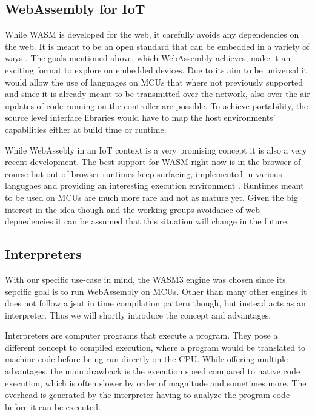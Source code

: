 \subsection{WebAssembly for IoT}

While WASM is developed for the web, it carefully avoids any dependencies on the web. It is meant to be an open standard that can be embedded in a variety of ways \autocite{noauthor_non-web_nodate}. The goals mentioned above, which WebAssembly achieves, make it an exciting format to explore on embedded devices. Due to its aim to be universal it would allow the use of languages on MCUs that where not previously supported and since it is already meant to be transmitted over the network, also over the air updates of code running on the controller are possible. To achieve portability, the source level interface libraries would have to map the host environments' capabilities either at build time or runtime.

While WebAssebly in an IoT context is a very promising concept it is also a very recent development. The best support for WASM right now is in the browser of course but out of browser runtimes keep surfacing, implemented in various langugaes and providing an interesting execution environment \autocite{akinyemi_appcypherawesome-wasm-runtimes_2020}. Runtimes meant to be used on MCUs are much more rare and not as mature yet. Given the big interest in the idea though and the working groups avoidance of web depnedencies it can be assumed that this situation will change in the future.

\subsection{Interpreters}

With our specific use-case in mind, the WASM3 \autocite{noauthor_wasm3wasm3_2020} engine was chosen since its sepcific goal is to run WebAssembly on MCUs. Other than many other engines it does not follow a jsut in time compilation pattern though, but instead acts as an interpreter. Thus we will shortly introduce the concept and advantages.

Interpreters are computer programs that execute a program. They pose a different concept to compiled execution, where a program would be translated to machine code before being run directly on the CPU. While offering multiple advantages, the main drawback is the execution speed compared to native code execution, which is often slower by order of magnitude and sometimes more. The overhead is generated by the interpreter having to analyze the program code before it can be executed.

